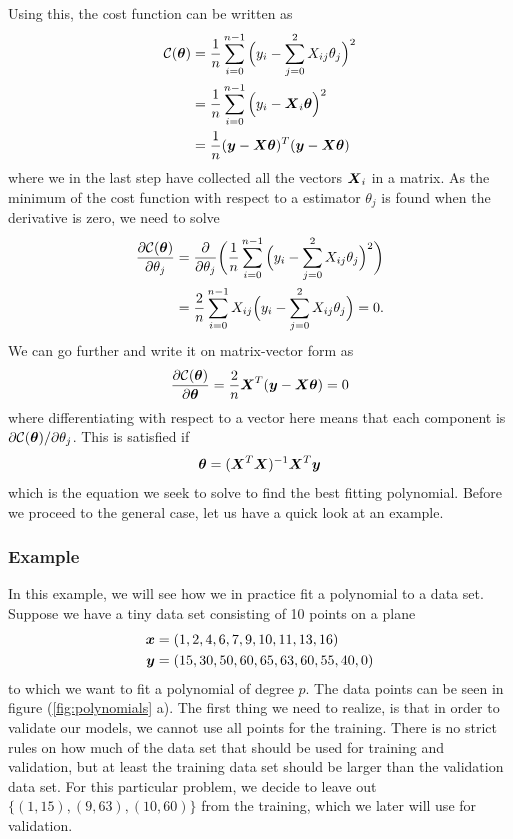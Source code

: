 Using this, the cost function can be written as
\begin{align}
\mathcal{C}(\boldsymbol{{\theta}})&=\frac{1}{n}\sum_{i=0}^{n-1}\Big(y_i-\sum_{j=0}^2X_{ij}\theta_j\Big)^2\notag\\
&=\frac{1}{n}\sum_{i=0}^{n-1}\Big(y_i-\boldsymbol{{X}}_i\boldsymbol{{\theta}}\Big)^2\label{eq:costols}\\
&=\frac{1}{n}(\boldsymbol{{y}}-\boldsymbol{{X}}\boldsymbol{{\theta}})^T(\boldsymbol{{y}}-\boldsymbol{{X}}\boldsymbol{{\theta}})\notag
\end{align}
where we in the last step have collected all the vectors $\boldsymbol{{X}}_i$ in a matrix. As the minimum of the cost function with respect to a estimator $\theta_j$ is found when the derivative is zero, we need to solve
\begin{align*}
\frac{\partial \mathcal{C}(\boldsymbol{{\theta}})}{\partial\theta_j} &=\frac{\partial}{\partial\theta_j}\bigg(\frac{1}{n}\sum_{i=0}^{n-1}\Big(y_i-\sum_{j=0}^2X_{ij}\theta_j\Big)^2\bigg)\notag\label{eq:gh}\\
&=\frac{2}{n}\sum_{i=0}^{n-1}X_{ij}\Big(y_i-\sum_{j=0}^2X_{ij}\theta_j\Big)=0.
\end{align*}
We can go further and write it on matrix-vector form as
\begin{equation*}
\frac{\partial \mathcal{C}(\boldsymbol{{\theta}})}{\partial\boldsymbol{{\theta}}}=\frac{2}{n}\boldsymbol{{X}}^T(\boldsymbol{{y}}-\boldsymbol{{X}}\boldsymbol{{\theta}})=0
\end{equation*}
where differentiating with respect to a vector here means that each component is $\partial\mathcal{C(\boldsymbol{{\theta}})}/\partial\theta_j$. This is satisfied if
\begin{equation}
\boldsymbol{{\theta}}=(\boldsymbol{{X}}^T\boldsymbol{{X}})^{-1}\boldsymbol{{X}}^T\boldsymbol{{y}}
\label{eq:polynomialestimators}
\end{equation}
which is the equation we seek to solve to find the best fitting polynomial. Before we proceed to the general case, let us have a quick look at an example.

\subsubsection{Example} \label{sec:example}
In this example, we will see how we in practice fit a polynomial to a data set. Suppose we have a tiny data set consisting of 10 points on a plane
\begin{align}
\boldsymbol{{x}}&=(1,2,4,6,7,9,10,11,13,16)\notag\\
\boldsymbol{{y}}&=(15,30,50,60,65,63,60,55,40,0)
\label{eq:datapoints}
\end{align}
to which we want to fit a polynomial of degree $p$. The data points can be seen in figure (\ref{fig:polynomials} a). The first thing we need to realize, is that in order to validate our models, we cannot use all points for the training. There is no strict rules on how much of the data set that should be used for training and validation, but at least the training data set should be larger than the validation data set. For this particular problem, we decide to leave out $\{(1,15),(9,63),(10,60)\}$ from the training, which we later will use for validation.

